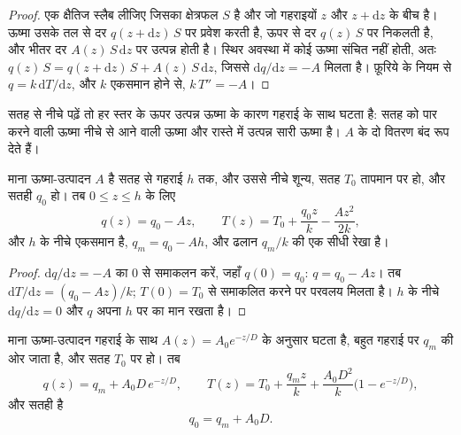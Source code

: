 \begin{proof}
एक क्षैतिज स्लैब लीजिए जिसका क्षेत्रफल $S$ है और जो गहराइयों $z$ और $z +
\mathrm dz$ के बीच है। ऊष्मा उसके तल से दर $q(z + \mathrm dz)\,S$ पर प्रवेश करती है, ऊपर से दर $q(z)\,S$ पर निकलती है, और भीतर दर $A(z)\,S\,\mathrm dz$ पर उत्पन्न होती है। स्थिर अवस्था में कोई ऊष्मा संचित नहीं होती, अतः $q(z)\,S = q(z + \mathrm dz)\,S + A(z)\,S\,\mathrm dz$, जिससे $\mathrm dq/\mathrm dz = -A$ मिलता है। फ़ूरिये के नियम से $q = k\,\mathrm dT/\mathrm dz$, और $k$ एकसमान होने से, $k\,T'' = -A$।
\end{proof}

सतह से नीचे पढ़ें तो  हर स्तर के ऊपर उत्पन्न ऊष्मा के कारण गहराई के साथ घटता है: सतह को पार करने वाली ऊष्मा नीचे से आने वाली ऊष्मा और रास्ते में उत्पन्न सारी ऊष्मा है। $A$ के दो वितरण बंद रूप देते हैं।

\begin{proposition}\label{prop:b1:heat-budget:uniform}
माना ऊष्मा-उत्पादन $A$ है सतह से गहराई $h$ तक, और उससे नीचे शून्य, सतह $T_0$ तापमान पर हो, और सतही  $q_0$ हो। तब $0 \le z \le h$ के लिए
\[
  q(z) = q_0 - A z, \qquad T(z) = T_0 + \frac{q_0 z}{k} - \frac{A z^2}{2k},
\]
और $h$ के नीचे  एकसमान है, $q_m = q_0 - A h$, और  ढलान $q_m/k$ की एक सीधी रेखा है।
\end{proposition}

\begin{proof}
$\mathrm dq/\mathrm dz = -A$ का $0$ से समाकलन करें, जहाँ $q(0) = q_0$: $q = q_0 -
Az$। तब $\mathrm dT/\mathrm dz = (q_0 - Az)/k$; $T(0) = T_0$ से समाकलित करने पर परवलय मिलता है। $h$ के नीचे $\mathrm dq/\mathrm dz = 0$ और $q$ अपना $h$ पर का मान रखता है।
\end{proof}

\begin{theorem}[घातांकी ऊष्मा-उत्पादन और रैखिक ऊष्मा-प्रवाह संबंध]
\label{thm:b1:heat-budget:exponential}
माना ऊष्मा-उत्पादन गहराई के साथ $A(z) = A_0 e^{-z/D}$ के अनुसार घटता है,  बहुत गहराई पर $q_m$ की ओर जाता है, और सतह $T_0$ पर हो। तब
\[
  q(z) = q_m + A_0 D\,e^{-z/D}, \qquad
  T(z) = T_0 + \frac{q_m z}{k} + \frac{A_0 D^2}{k}\bigl(1 - e^{-z/D}\bigr),
\]
और सतही  है
\[
  q_0 = q_m + A_0 D .
\]
\end{theorem}

